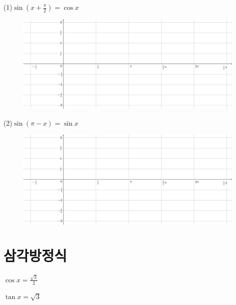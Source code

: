\documentclass{oblivoir}
\begin{document}
\newpage
%
\label{graph6}
(1)\;\;\(\sin(x+\frac\pi2)=\cos x\)
\begin{figure}[h!]
\centering
\includegraphics[width=\textwidth]{graph_grid}
\end{figure}
\par\noindent
(2)\;\;\(\sin(\pi-x)=\sin x\)
\begin{figure}[h!]
\centering
\includegraphics[width=\textwidth]{graph_grid}
\end{figure}

\section{삼각방정식}

%
\label{equa1}
\begin{enumerate*}[itemjoin=\tabto{.5\textwidth}]
\item
\(\cos x=\frac{\sqrt3}2\)
\item
\(\tan x=\sqrt3\)
\end{enumerate*}
\end{document}
